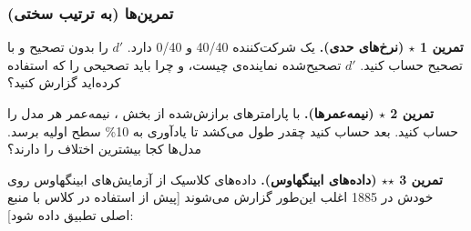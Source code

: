 \subsubsection{تمرین‌ها (به ترتیب سختی)}

\textbf{تمرین 1 \ensuremath{\star} (نرخ‌های حدی).} یک شرکت‌کننده 40/40  و 0/40
 دارد. \(d'\) را بدون تصحیح و با تصحیح 
حساب کنید. \(d'\) تصحیح‌شده نماینده‌ی چیست، و چرا باید تصحیحی را که
استفاده کرده‌اید گزارش کنید؟

\textbf{تمرین 2 \ensuremath{\star} (نیمه‌عمرها).} با پارامترهای برازش‌شده از بخش ،
نیمه‌عمر هر مدل را حساب کنید. بعد حساب کنید چقدر طول می‌کشد تا یادآوری به
10\% سطح اولیه برسد. مدل‌ها کجا بیشترین اختلاف را دارند؟

\textbf{تمرین 3 \ensuremath{\star}\ensuremath{\star} (داده‌های ابینگهاوس).} داده‌های کلاسیک  از
آزمایش‌های ابینگهاوس روی خودش در 1885 اغلب این‌طور گزارش می‌شوند {[}پیش از
استفاده در کلاس با منبع اصلی تطبیق داده شود{]}:

